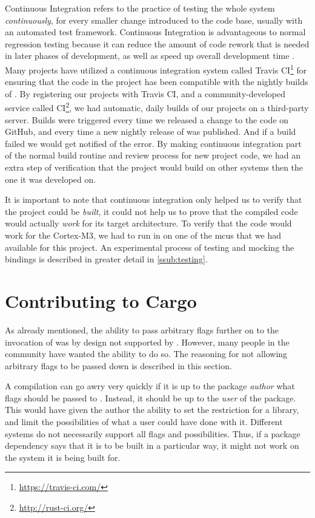 Continuous Integration refers to the practice of testing the whole system \emph{continuously}, for every smaller change introduced to the code base, usually with an automated test framework.
Continuous Integration is advantageous to normal regression testing because it can reduce the amount of code rework that is needed in later phases of development, as well as speed up overall development time  \cite{Orso2014}.
Many {\rust} projects have utilized a continuous integration system called Travis CI\footnote{\url{https://travis-ci.com/}} for ensuring that the code in the project has been compatible with the nightly builds of {\rust}.
By registering our projects with Travis CI, and a community-developed service called {\rust} CI\footnote{\url{http://rust-ci.org/}}, we had automatic, daily builds of our projects on a third-party server.
Builds were triggered every time we released a change to the code on GitHub, and every time a new nightly release of {\rust} was published.
And if a build failed we would get notified of the error.
By making continuous integration part of the normal build routine and review process for new project code, we had an extra step of verification that the project would build on other systems then the one it was developed on.

It is important to note that continuous integration only helped us to verify that the project could be \emph{built}, it could not help us to prove that the compiled code would actually \emph{work} for its target architecture.
To verify that the code would work for the Cortex-M3, we had to run in on one of the \glspl{mcu} that we had available for this project.
An experimental process of testing and mocking the {\rg} bindings is described in greater detail in \autoref{ssub:testing}.

\section{Contributing to Cargo}
\label{ssub:contributing_to_cargo}

As already mentioned, the ability to pass arbitrary flags further on to the invocation of {\rustc} was by design not supported by {\cargo}.
However, many people in the {\rust} community have wanted the ability to do so.
The reasoning for not allowing arbitrary flags to be passed down is described in this section.

A compilation can go awry very quickly if it is up to the package \emph{author} what flags should be passed to {\rustc}.
Instead, it should be up to the \emph{user} of the package.
This would have given the author the ability to set the restriction for a library, and limit the possibilities of what a user could have done with it.
Different systems do not necessarily support all flags and possibilities.
Thus, if a package dependency says that it is to be built in a particular way, it might not work on the system it is being built for.

